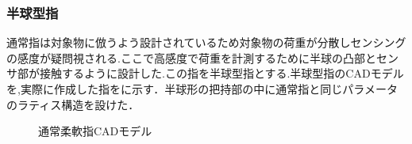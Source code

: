 \subsubsection{半球型指}
通常指は対象物に倣うよう設計されているため対象物の荷重が分散しセンシングの感度が疑問視される.ここで高感度で荷重を計測するために半球の凸部とセンサ部が接触するように設計した.この指を半球型指とする.半球型指のCADモデルを,実際に作成した指をに示す．半球形の把持部の中に通常指と同じパラメータのラティス構造を設けた．

\begin{figure}[h]
\centering
{}
\hspace{5mm}
\caption{通常柔軟指CADモデル}
\label{fig::soft_finger_CAD}
\end{figure}

